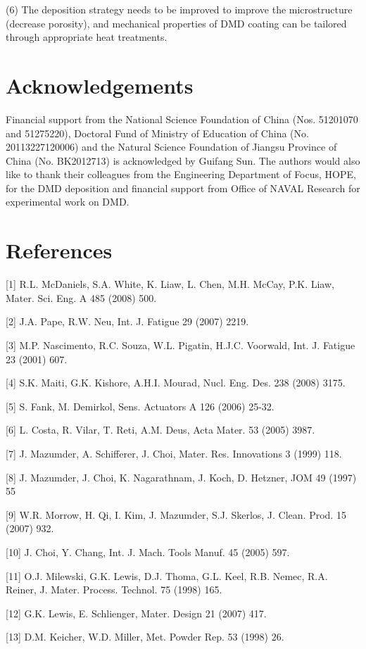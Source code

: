 \documentclass[10pt]{article}
\begin{document}
(6) The deposition strategy needs to be improved to improve the microstructure (decrease porosity), and mechanical properties of DMD coating can be tailored through appropriate heat treatments.

\section*{Acknowledgements}
Financial support from the National Science Foundation of China (Nos. 51201070 and 51275220), Doctoral Fund of Ministry of Education of China (No. 20113227120006) and the Natural Science Foundation of Jiangsu Province of China (No. BK2012713) is acknowledged by Guifang Sun. The authors would also like to thank their colleagues from the Engineering Department of Focus, HOPE, for the DMD deposition and financial support from Office of NAVAL Research for experimental work on DMD.

\section*{References}
[1] R.L. McDaniels, S.A. White, K. Liaw, L. Chen, M.H. McCay, P.K. Liaw, Mater. Sci. Eng. A 485 (2008) 500.

[2] J.A. Pape, R.W. Neu, Int. J. Fatigue 29 (2007) 2219.

[3] M.P. Nascimento, R.C. Souza, W.L. Pigatin, H.J.C. Voorwald, Int. J. Fatigue 23 (2001) 607.

[4] S.K. Maiti, G.K. Kishore, A.H.I. Mourad, Nucl. Eng. Des. 238 (2008) 3175.

[5] S. Fank, M. Demirkol, Sens. Actuators A 126 (2006) 25-32.

[6] L. Costa, R. Vilar, T. Reti, A.M. Deus, Acta Mater. 53 (2005) 3987.

[7] J. Mazumder, A. Schifferer, J. Choi, Mater. Res. Innovations 3 (1999) 118.

[8] J. Mazumder, J. Choi, K. Nagarathnam, J. Koch, D. Hetzner, JOM 49 (1997) 55

[9] W.R. Morrow, H. Qi, I. Kim, J. Mazumder, S.J. Skerlos, J. Clean. Prod. 15 (2007) 932.

[10] J. Choi, Y. Chang, Int. J. Mach. Tools Manuf. 45 (2005) 597.

[11] O.J. Milewski, G.K. Lewis, D.J. Thoma, G.L. Keel, R.B. Nemec, R.A. Reiner, J. Mater. Process. Technol. 75 (1998) 165.

[12] G.K. Lewis, E. Schlienger, Mater. Design 21 (2007) 417.

[13] D.M. Keicher, W.D. Miller, Met. Powder Rep. 53 (1998) 26.
\end{document}
